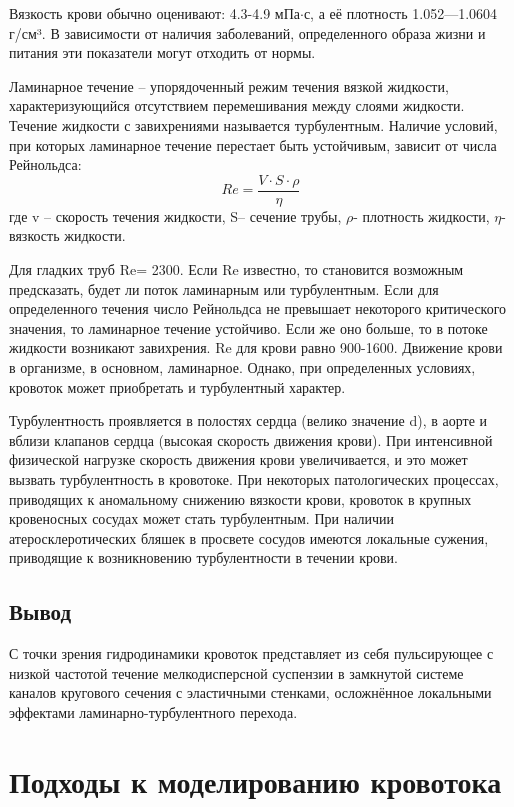 \documentclass[a4paper, 14pt]{article}
\begin{document}
Вязкость крови обычно оценивают: 4.3-4.9 мПа$\cdot$с, а её плотность 1.052—1.0604 г/см³. В зависимости от наличия заболеваний, определенного образа жизни и питания эти показатели могут отходить от нормы. 

Ламинарное течение – упорядоченный режим течения вязкой жидкости, характеризующийся отсутствием перемешивания между слоями жидкости. Течение жидкости с завихрениями называется турбулентным. 
Наличие условий, при которых ламинарное течение перестает быть устойчивым, зависит от числа Рейнольдса:
$$Re=\frac{V\cdot S\cdot \rho}{\eta}$$
где v – скорость течения жидкости, S– сечение трубы, $\rho$- плотность жидкости, $\eta$- вязкость жидкости.

Для гладких труб Re= 2300. Если Re известно, то становится возможным предсказать, будет ли поток ламинарным или турбулентным. Если для определенного течения число Рейнольдса не превышает некоторого критического значения, то ламинарное течение устойчиво. Если же оно больше, то в потоке жидкости возникают завихрения. Re для крови равно 900-1600. Движение крови в организме, в основном, ламинарное. Однако, при определенных условиях, кровоток может приобретать и турбулентный характер.

Турбулентность проявляется в полостях сердца (велико значение d), в аорте и вблизи клапанов сердца (высокая скорость движения крови). При интенсивной физической нагрузке скорость движения крови увеличивается, и это может вызвать турбулентность в кровотоке. При некоторых патологических процессах, приводящих к аномальному снижению вязкости крови, кровоток в крупных кровеносных сосудах может стать турбулентным.  При наличии атеросклеротических бляшек в просвете сосудов имеются локальные сужения, приводящие к возникновению турбулентности в течении крови. 

\subsection{Вывод}
 С точки зрения гидродинамики кровоток представляет из себя пульсирующее с низкой частотой течение мелкодисперсной суспензии в замкнутой системе каналов кругового сечения с эластичными стенками, осложнённое локальными эффектами ламинарно-турбулентного перехода.

\section{Подходы к моделированию кровотока}
\end{document}
